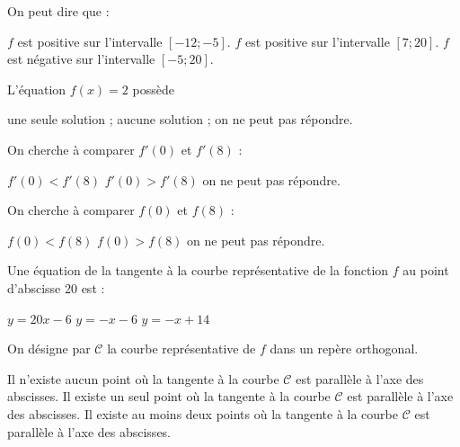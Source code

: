 \begin{questions}
	\question[1] On peut dire que :
	
		\begin{checkboxes}
			\choice $f$ est positive sur l'intervalle $[-12; -5]$.
			\choice $f$ est positive sur l'intervalle $[7; 20]$.
			\correctchoice $f$ est négative sur l'intervalle $[-5; 20]$.
		\end{checkboxes}
	
		
	\question[1] L'équation $f(x)=2$ possède 
	
	\begin{oneparcheckboxes}
		
		\correctchoice une seule solution ;
		\choice aucune solution ; 
		\choice on ne peut pas répondre.
	\end{oneparcheckboxes}	

	\question[1] On cherche à comparer $f'(0)$ et $f'(8)$ :

\begin{oneparcheckboxes}
	
	
	\choice $f'(0) < f'(8)$
	\correctchoice $f'(0) > f'(8)$
	\choice on ne peut pas répondre.
\end{oneparcheckboxes}

	\question[1] On cherche à comparer $f(0)$ et $f(8)$ :
	
	\begin{oneparcheckboxes}
		
		
		\choice $f(0) < f(8)$
		\choice $f(0) > f(8)$
		\correctchoice on ne peut pas répondre.
	\end{oneparcheckboxes}



	\question[1] Une équation de la tangente à la courbe représentative de la fonction $f$ au point d'abscisse 20 est :
	
	\begin{oneparcheckboxes}
		
		
		\choice $y = 20x - 6$
		\choice $y = -x - 6$
		\correctchoice $y = -x + 14$
	\end{oneparcheckboxes}

	\question[1] On désigne par $\mathcal{C}$ la courbe représentative de $f$ dans un repère orthogonal.
	
	\begin{oneparcheckboxes}
		
		\choice Il n'existe aucun point où la tangente à la courbe $\mathcal{C}$ est parallèle à l'axe des abscisses.
		\choice Il existe un seul point où la tangente à la courbe $\mathcal{C}$ est parallèle à l'axe des abscisses.
		\correctchoice Il existe au moins deux points où la tangente à la courbe $\mathcal{C}$ est parallèle à l'axe des abscisses.
	\end{oneparcheckboxes}	
\end{questions}